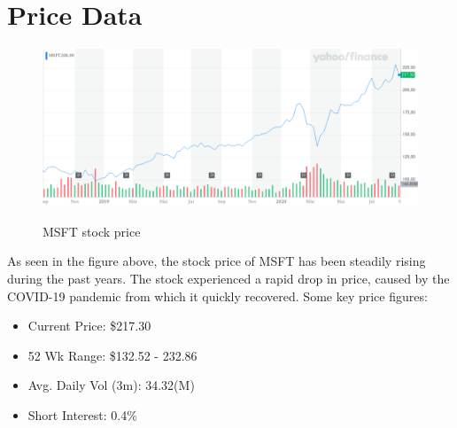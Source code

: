\documentclass[]{article}
\begin{document}
\section{Price Data}
\begin{figure}[h]
	\centering
	\includegraphics[scale=0.35]{"MSFT_YahooFinanceChart.png"}
	\caption{MSFT stock price}
	\cite{yahoo!finance_2020}
	\label{fig:meine-grafik}
\end{figure}
\noindent As seen in the figure above, the stock price of MSFT has been steadily rising during the past years. The stock experienced a rapid drop in price, caused by the COVID-19 pandemic from which it quickly recovered. Some key price figures:
\begin{itemize}
	\item Current Price: \$217.30
	\item 52 Wk Range: \$132.52 - 232.86
	\item Avg. Daily Vol (3m): 34.32(M)
	\item Short Interest: 0.4\%
\end{itemize}
\end{document}
